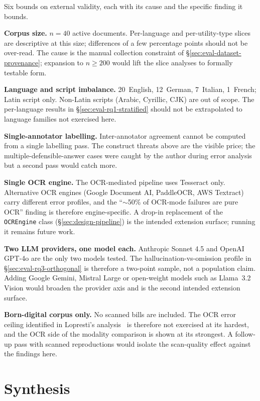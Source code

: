 Six bounds on external validity, each with its cause and the
specific finding it bounds.

\textbf{Corpus size.} $n=40$ active documents. Per-language and
per-utility-type slices are descriptive at this size; differences
of a few percentage points should not be over-read. The cause is
the manual collection constraint of
\S\ref{sec:eval-dataset-provenance}; expansion to $n\geq 200$
would lift the slice analyses to formally testable form.

\textbf{Language and script imbalance.} 20~English, 12~German,
7~Italian, 1~French; Latin script only. Non-Latin scripts (Arabic,
Cyrillic, CJK) are out of scope. The per-language results in
\S\ref{sec:eval-rq1-stratified} should not be extrapolated to
language families not exercised here.

\textbf{Single-annotator labelling.} Inter-annotator agreement
cannot be computed from a single labelling pass. The construct
threats above are the visible price; the multiple-defensible-answer
cases were caught by the author during error analysis but a second
pass would catch more.

\textbf{Single OCR engine.} The OCR-mediated pipeline uses
Tesseract only. Alternative OCR engines (Google Document AI,
PaddleOCR, AWS Textract) carry different error profiles, and the
``$\sim$50\% of OCR-mode failures are pure OCR'' finding is
therefore engine-specific. A drop-in replacement of the
\texttt{OCREngine} class (\S\ref{sec:design-pipeline}) is the
intended extension surface; running it remains future work.

\textbf{Two LLM providers, one model each.} Anthropic Sonnet 4.5
and OpenAI GPT-4o are the only two models tested. The
hallucination-vs-omission profile in \S\ref{sec:eval-rq3-orthogonal}
is therefore a two-point sample, not a population claim. Adding
Google Gemini, Mistral Large or open-weight models such as
Llama~3.2 Vision would broaden the provider axis and is the second
intended extension surface.

\textbf{Born-digital corpus only.} No scanned bills are included.
The OCR error ceiling identified in Lopresti's
analysis~\cite{lopresti2009ocrerrors} is therefore not exercised
at its hardest, and the OCR side of the modality comparison is
shown at its strongest. A follow-up pass with scanned reproductions
would isolate the scan-quality effect against the findings here.

\section{Synthesis}
\label{sec:eval-synthesis}

